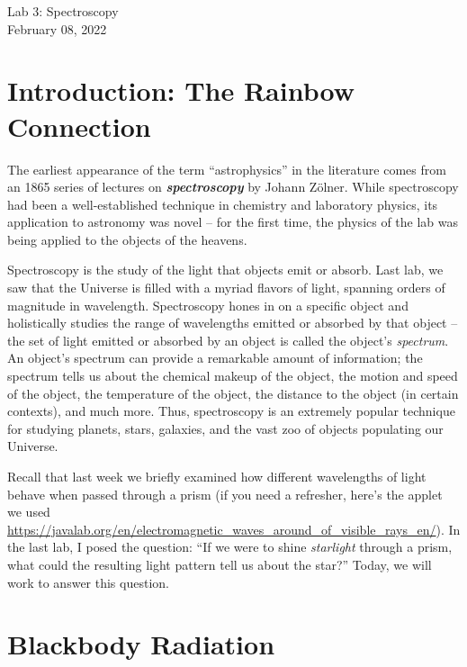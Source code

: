 \documentclass[11pt]{article}
\begin{document}
\begin{center}
\huge{Lab 3: Spectroscopy}\\ \medskip \Large{February 08, 2022}
\end{center}

\section{Introduction: The Rainbow Connection}
The earliest appearance of the term ``astrophysics'' in the literature comes from an 1865 series of lectures on \emph{\textbf{spectroscopy}} by Johann Z\"{o}lner. While spectroscopy had been a well-established technique in chemistry and laboratory physics, its application to astronomy was novel -- for the first time, the physics of the lab was being applied to the objects of the heavens. 

Spectroscopy is the study of the light that objects emit or absorb. Last lab, we saw that the Universe is filled with a myriad flavors of light, spanning orders of magnitude in wavelength. Spectroscopy hones in on a specific object and holistically studies the range of wavelengths emitted or absorbed by that object -- the set of light emitted or absorbed by an object is called the object's \emph{spectrum}. An object's spectrum can provide a remarkable amount of information; the spectrum tells us about the chemical makeup of the object, the motion and speed of the object, the temperature of the object, the distance to the object (in certain contexts), and much more. Thus, spectroscopy is an extremely popular technique for studying planets, stars, galaxies, and the vast zoo of objects populating our Universe.


Recall that last week we briefly examined how different wavelengths of light behave when passed through a prism (if you need a refresher, here's the applet we used \url{https://javalab.org/en/electromagnetic_waves_around_of_visible_rays_en/}). In the last lab, I posed the question: ``If we were to shine \emph{starlight} through a prism, what could the resulting light pattern tell us about the star?'' Today, we will work to answer this question.

\section{Blackbody Radiation}
\end{document}
